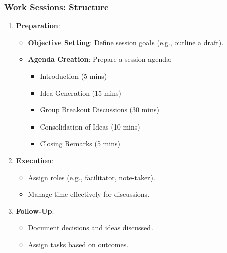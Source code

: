 \documentclass[aspectratio=169]{beamer}
\begin{document}
\begin{frame}[fragile]
    \frametitle{Work Sessions: Structure}
    \begin{enumerate}
        \item \textbf{Preparation}:
            \begin{itemize}
                \item \textbf{Objective Setting}: Define session goals (e.g., outline a draft).
                \item \textbf{Agenda Creation}: Prepare a session agenda:
                    \begin{itemize}
                        \item Introduction (5 mins)
                        \item Idea Generation (15 mins)
                        \item Group Breakout Discussions (30 mins)
                        \item Consolidation of Ideas (10 mins)
                        \item Closing Remarks (5 mins)
                    \end{itemize}
            \end{itemize}
        
        \item \textbf{Execution}:
            \begin{itemize}
                \item Assign roles (e.g., facilitator, note-taker).
                \item Manage time effectively for discussions.
            \end{itemize}
        
        \item \textbf{Follow-Up}:
            \begin{itemize}
                \item Document decisions and ideas discussed.
                \item Assign tasks based on outcomes.
            \end{itemize}
    \end{enumerate}
\end{frame}
\end{document}
